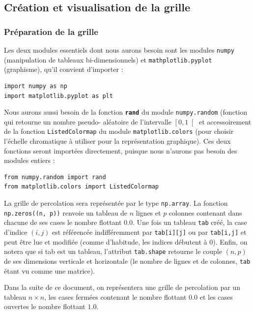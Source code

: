 \subsection*{Création et visualisation de la grille}\label{cruxe9ation-et-visualisation-de-la-grille}

\subsubsection*{Préparation de la grille}

Les deux modules essentiels dont nous aurons besoin sont les modules
\texttt{numpy} (manipulation de tableaux bi-dimensionnels) et \texttt{mathplotlib.pyplot}
(graphisme), qu'il convient d'importer :

\begin{lstlisting}
import numpy as np
import matplotlib.pyplot as plt
\end{lstlisting}

Nous aurons aussi besoin de la fonction \textbf{\texttt{rand}} du module \texttt{numpy.random}
(fonction qui retourne un nombre pseudo- aléatoire de l'intervalle
$\left[0,1\right[$ et accessoirement de la fonction \texttt{ListedColormap} du
module \texttt{matplotlib.colors} (pour choisir l'échelle chromatique à utiliser
pour la représentation graphique). Ces deux fonctions seront importées
directement, puisque nous n'aurons pas besoin des modules entiers :

\begin{lstlisting}
from numpy.random import rand
from matplotlib.colors import ListedColormap
\end{lstlisting}

La grille de percolation sera représentée par le type \texttt{np.array}. La
fonction \texttt{np.zeros((n, p))} renvoie un tableau de $n$ lignes et
$p$ colonnes contenant dans chacune de ses cases le nombre flottant
0.0. Une fois un tableau \texttt{tab} créé, la case d'indice $(i, j)$ est
référencée indifféremment par \texttt{tab[i][j]} ou par \texttt{tab[i,j]} et
peut être lue et modifiée (comme d'habitude, les indices débutent à 0).
Enfin, on notera que si tab est un tableau, l'attribut \texttt{tab.shape}
retourne le couple $(n, p)$ de ses dimensions verticale et
horizontale (le nombre de lignes et de colonnes, \texttt{tab} étant vu comme une
matrice).

Dans la suite de ce document, on représentera une grille de percolation
par un tableau $n\times n$, les cases fermées contenant le nombre
flottant $0.0$ et les cases ouvertes le nombre flottant $1.0$.

